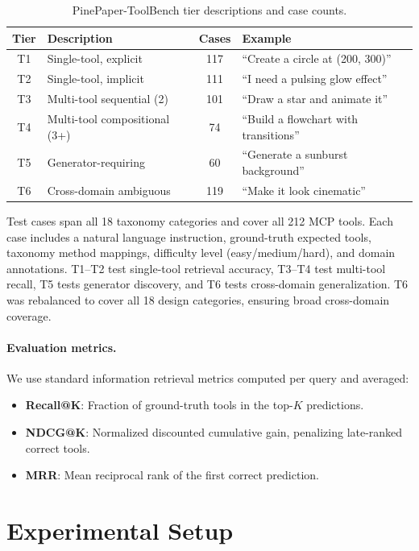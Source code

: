 \documentclass[11pt,a4paper]{article}
\begin{document}
\begin{table}[h]
\centering
\caption{PinePaper-ToolBench tier descriptions and case counts.}
\label{tab:tiers}
\begin{tabular}{clcl}
\toprule
Tier & Description & Cases & Example \\
\midrule
T1 & Single-tool, explicit & 117 & ``Create a circle at (200, 300)'' \\
T2 & Single-tool, implicit & 111 & ``I need a pulsing glow effect'' \\
T3 & Multi-tool sequential (2) & 101 & ``Draw a star and animate it'' \\
T4 & Multi-tool compositional (3+) & 74 & ``Build a flowchart with transitions'' \\
T5 & Generator-requiring & 60 & ``Generate a sunburst background'' \\
T6 & Cross-domain ambiguous & 119 & ``Make it look cinematic'' \\
\bottomrule
\end{tabular}
\end{table}

Test cases span all 18 taxonomy categories and cover all 212 MCP tools. Each case includes a natural language instruction, ground-truth expected tools, taxonomy method mappings, difficulty level (easy/medium/hard), and domain annotations. T1--T2 test single-tool retrieval accuracy, T3--T4 test multi-tool recall, T5 tests generator discovery, and T6 tests cross-domain generalization. T6 was rebalanced to cover all 18 design categories, ensuring broad cross-domain coverage.

\paragraph{Evaluation metrics.}
We use standard information retrieval metrics computed per query and averaged:
\begin{itemize}
  \item \textbf{Recall@K}: Fraction of ground-truth tools in the top-$K$ predictions.
  \item \textbf{NDCG@K}: Normalized discounted cumulative gain, penalizing late-ranked correct tools.
  \item \textbf{MRR}: Mean reciprocal rank of the first correct prediction.
\end{itemize}

\section{Experimental Setup}
\label{sec:experiments}
\end{document}
